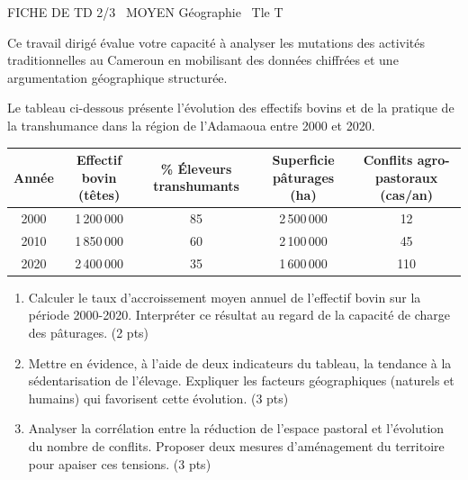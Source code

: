 \documentclass[11pt]{article}
\begin{document}
\begin{tcolorbox}[enhanced,colback=popink,colframe=popink,arc=10pt,boxrule=0pt,left=12pt,right=12pt,top=9pt,bottom=9pt]
{\color{white}\popxbold\small FICHE DE TD 2/3 \textbullet\ MOYEN \hfill Géographie \textbullet\ Tle T\par}
\end{tcolorbox}
\vspace{4pt}
Ce travail dirigé évalue votre capacité à analyser les mutations des activités traditionnelles au Cameroun en mobilisant des données chiffrées et une argumentation géographique structurée.

\begin{exercice}
Le tableau ci-dessous présente l'évolution des effectifs bovins et de la pratique de la transhumance dans la région de l'Adamaoua entre 2000 et 2020.

\begin{center}
\begin{tabular}{|c|c|c|c|c|}
\hline
\textbf{Année} & \textbf{Effectif bovin (têtes)} & \textbf{\% Éleveurs transhumants} & \textbf{Superficie pâturages (ha)} & \textbf{Conflits agro-pastoraux (cas/an)} \\
\hline
2000 & 1\,200\,000 & 85 & 2\,500\,000 & 12 \\
2010 & 1\,850\,000 & 60 & 2\,100\,000 & 45 \\
2020 & 2\,400\,000 & 35 & 1\,600\,000 & 110 \\
\hline
\end{tabular}
\end{center}

\begin{enumerate}
\item Calculer le taux d'accroissement moyen annuel de l'effectif bovin sur la période 2000-2020. Interpréter ce résultat au regard de la capacité de charge des pâturages. \hfill (2 pts)
\item Mettre en évidence, à l'aide de deux indicateurs du tableau, la tendance à la sédentarisation de l'élevage. Expliquer les facteurs géographiques (naturels et humains) qui favorisent cette évolution. \hfill (3 pts)
\item Analyser la corrélation entre la réduction de l'espace pastoral et l'évolution du nombre de conflits. Proposer deux mesures d'aménagement du territoire pour apaiser ces tensions. \hfill (3 pts)
\end{enumerate}
\end{exercice}
\end{document}
